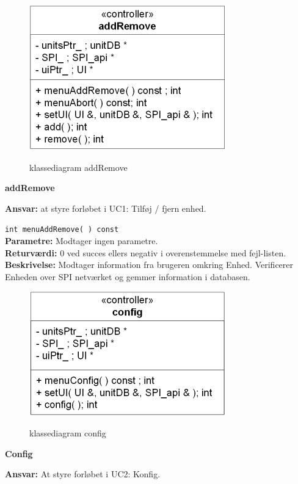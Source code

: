 \newpage

\begin{figure}[htbp] \centering
{\includegraphics[scale=1.5]{filer/design/Klassediagrammer/sw_addRemove}}
\caption{klassediagram addRemove}
\label{fig:addRemove klassediagram}
\end{figure} 

{\centering
\textbf{addRemove}\par
}
\textbf{Ansvar:} at styre forløbet i UC1: Tilføj / fjern enhed. \

\verb+int menuAddRemove( ) const+ \\
\textbf{Parametre:} Modtager ingen parametre. \\
\textbf{Returværdi:} 0 ved succes ellers negativ i overenstemmelse med fejl-listen. \\
\textbf{Beskrivelse:} Modtager information fra brugeren omkring Enhed. Verificerer Enheden over SPI netværket og gemmer information i databasen.\\

\begin{figure}[htbp] \centering
{\includegraphics[scale=1.5]{filer/design/Klassediagrammer/sw_config}}
\caption{klassediagram config}
\label{fig:config klassediagram}
\end{figure} 

{\centering
\textbf{Config}\par
}
\textbf{Ansvar:} At styre forløbet i UC2: Konfig. \

